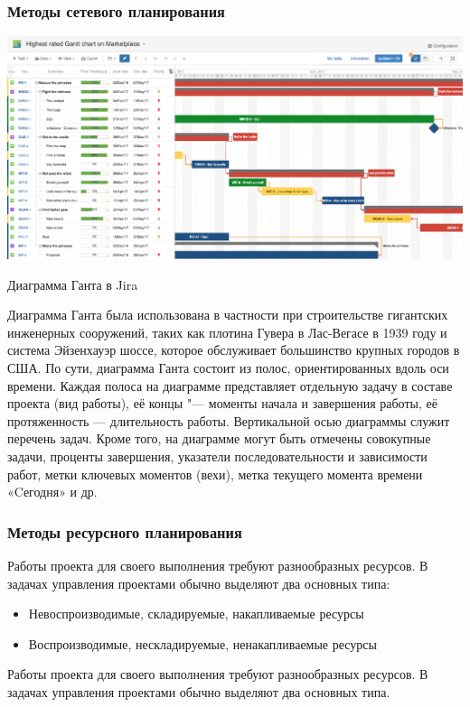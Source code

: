 \documentclass{../industrial-development}
\begin{document}
    \begin{frame} \frametitle{Методы сетевого планирования}
         \centerline{\includegraphics[width=1\textwidth]{gantt.png}}
	\centerline{Диаграмма Ганта в Jira}
    \end{frame}
    \lecturenotes

Диаграмма Ганта была использована в частности при строительстве гигантских инженерных сооружений, таких как плотина Гувера в Лас-Вегасе в 1939 году и система Эйзенхауэр шоссе, которое обслуживает большинство крупных городов в США. 
По сути, диаграмма Ганта состоит из полос, ориентированных вдоль оси времени. Каждая полоса на диаграмме представляет отдельную задачу в составе проекта (вид работы), её концы "--- моменты начала и завершения работы, её протяженность — длительность работы. Вертикальной осью диаграммы служит перечень задач. Кроме того, на диаграмме могут быть отмечены совокупные задачи, проценты завершения, указатели последовательности и зависимости работ, метки ключевых моментов (вехи), метка текущего момента времени «Cегодня» и др.

    \begin{frame} \frametitle{Методы ресурсного планирования}
Работы проекта для своего выполнения требуют разнообразных ресурсов. В задачах управления проектами обычно выделяют два основных типа:
        \begin{itemize}
         	  \item Невоспроизводимые, складируемые, накапливаемые ресурсы
	  \item Воспроизводимые, нескладируемые, ненакапливаемые ресурсы
        \end{itemize}
    \end{frame}
    \lecturenotes 

Работы проекта для своего выполнения требуют разнообразных ресурсов. В задачах управления проектами обычно выделяют два основных типа.
\end{document}
